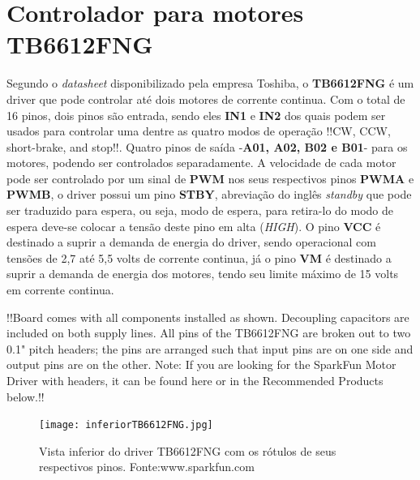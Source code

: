 \documentclass[a4paper,12pt,portuguese]{ufms-cpcx}
\begin{document}
\section{Controlador para motores TB6612FNG}\label{TB6612FNG}
Segundo o \textit{datasheet} disponibilizado pela empresa Toshiba, o \textbf{TB6612FNG} é um driver que pode controlar até dois motores de corrente continua. Com o total de 16 pinos, dois pinos são entrada, sendo eles \textbf{IN1} e \textbf{IN2} dos quais podem ser usados para controlar uma dentre as quatro modos de operação !!CW, CCW, short-brake, and stop!!. Quatro pinos de saída -\textbf{A01, A02, B02 e B01}- para os motores, podendo ser controlados separadamente. A velocidade de cada motor pode ser controlado por um sinal de \textbf{PWM} nos seus respectivos pinos \textbf{PWMA} e \textbf{PWMB}, o driver possui um pino \textbf{STBY}, abreviação do inglês \textit{standby} que pode ser traduzido para espera, ou seja, modo de espera, para retira-lo do modo de espera deve-se colocar a tensão deste pino em alta (\textit{HIGH}). O pino \textbf{VCC} é destinado a suprir a demanda de energia do driver, sendo operacional com tensões de 2,7 até 5,5 volts de corrente continua, já o pino \textbf{VM} é destinado a suprir a demanda de energia dos motores, tendo seu limite máximo de 15 volts em corrente continua. 

!!Board comes with all components installed as shown. Decoupling capacitors are included on both supply lines. All pins of the TB6612FNG are broken out to two 0.1" pitch headers; the pins are arranged such that input pins are on one side and output pins are on the other.
Note: If you are looking for the SparkFun Motor Driver with headers, it can be found here or in the Recommended Products below.!!

\begin{figure}[H]
	\centering
	\texttt{[image: inferiorTB6612FNG.jpg]}
	\caption{Vista inferior do driver TB6612FNG com os rótulos de seus respectivos pinos. Fonte:www.sparkfun.com}
\end{figure}
\end{document}
